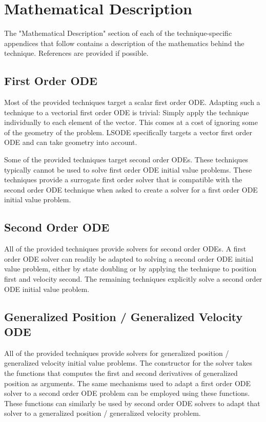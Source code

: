 \section{Mathematical Description}

The "Mathematical Description" section of each of the technique-specific
appendices that follow contains a description of the mathematics behind the
technique. References are provided if possible.

\subsection{First Order ODE}

Most of the provided techniques target a scalar first order ODE. Adapting
such a technique to a vectorial first order ODE is trivial: Simply apply
the technique individually to each element of the vector. This comes at a
cost of ignoring some of the geometry of the problem. LSODE specifically
targets a vector first order ODE and can take geometry into account.

Some of the provided techniques target second order ODEs. These techniques
typically cannot be used to solve first order ODE initial value problems. 
These techniques provide a surrogate first order solver that is compatible with
the second order ODE technique when asked to create a solver for a
first order ODE initial value problem.

\subsection{Second Order ODE}

All of the provided techniques provide solvers for second order ODEs. A first
order ODE solver can readily be adapted to solving a second order ODE
initial value problem, either by state doubling or by applying the technique
to position first and velocity second. The remaining techniques explicitly
solve a second order ODE initial value problem.

\subsection{Generalized Position / Generalized Velocity ODE}

All of the provided techniques provide solvers for generalized position /
generalized velocity initial value problems. The constructor for the
solver takes the functions that computes the first and second derivatives of
generalized position as arguments. The same mechanisms used to adapt a
first order ODE solver to a second order ODE problem can be employed using
these functions. These functions can similarly be used by second order
ODE solvers to adapt that solver to a generalized position / generalized
velocity problem.


